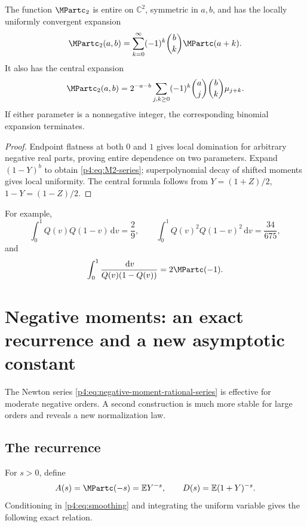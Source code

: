 \documentclass[11pt,oneside]{article}
\theoremstyle{definition}
\theoremstyle{remark}
\newcommand{\Q}{Q}
\newcommand{\E}{\mathbb E}
\newcommand{\C}{\mathbb C}
\newcommand{\dd}{\,\mathrm d}
\newcommand{\1}{\mathbf 1}
\begin{document}
\begin{proposition}\label{p4:prop:M2}
The function \(\MPartc_2\) is entire on \(\C^2\), symmetric in \(a,b\), and has the
locally uniformly convergent expansion
\begin{equation}\label{p4:eq:M2-series}
 \MPartc_2(a,b)=\sum_{k=0}^{\infty}(-1)^k\binom bk\MPartc(a+k).
\end{equation}
It also has the central expansion
\begin{equation}\label{p4:eq:M2-central}
 \MPartc_2(a,b)=2^{-a-b}
 \sum_{j,k\ge0}(-1)^k\binom aj\binom bk\mu_{j+k}.
\end{equation}
If either parameter is a nonnegative integer, the corresponding binomial expansion
terminates.
\end{proposition}

\begin{proof}
Endpoint flatness at both \(0\) and \(1\) gives local domination for arbitrary negative
real parts, proving entire dependence on two parameters.  Expand \((1-Y)^b\) to obtain
\cref{p4:eq:M2-series}; superpolynomial decay of shifted moments gives local uniformity.
The central formula follows from \(Y=(1+Z)/2\), \(1-Y=(1-Z)/2\).
\end{proof}

For example,
\begin{equation}\label{p4:eq:M2-examples}
 \int_0^1\Q(v)\Q(1-v)\dd v=\frac29,
 \qquad
 \int_0^1\Q(v)^2\Q(1-v)^2\dd v=\frac{34}{675},
\end{equation}
and
\begin{equation}\label{p4:eq:M2-negative-example}
 \int_0^1\frac{\dd v}{\Q(v)(1-\Q(v))}=2\MPartc(-1).
\end{equation}

\section{Negative moments: an exact recurrence and a new asymptotic constant}

The Newton series \cref{p4:eq:negative-moment-rational-series} is effective for moderate
negative orders.  A second construction is much more stable for large orders and reveals
a new normalization law.

\subsection{The recurrence}

For \(s>0\), define
\begin{equation}\label{p4:eq:A-D-def}
 A(s)=\MPartc(-s)=\E Y^{-s},
 \qquad
 D(s)=\E(1+Y)^{-s}.
\end{equation}
Conditioning in \cref{p4:eq:smoothing} and integrating the uniform variable gives the
following exact relation.
\end{document}
